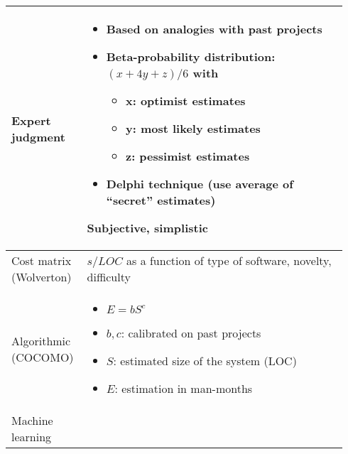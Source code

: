 \begin{table}[!ht]
    \begin{tabular}{p{0.19\linewidth}|p{0.75\linewidth}}
        \toprule
        Expert judgment & \begin{minipage}{\linewidth}\begin{itemize}
                            \item Based on analogies with past projects
                            \item Beta-probability distribution: $(x+4y+z)/6$ with
                                \begin{itemize}
                                    \item x: optimist estimates
                                    \item y: most likely estimates
                                    \item z: pessimist estimates
                                \end{itemize}
                            \item Delphi technique (use average of \enquote{secret}
                            estimates)
                          \end{itemize}
                          Subjective, simplistic\end{minipage} \\
        \midrule
        Cost matrix (Wolverton) &   $s/LOC$ as a function of type of software,
                                    novelty, difficulty \\
        \midrule
        Algorithmic (COCOMO) & \begin{minipage}{\linewidth}\begin{itemize}
                                    \item $E = b {S}^{c}$
                                    \item $b,c$: calibrated on past projects
                                    \item $S$: estimated size of the system (LOC)
                                    \item $E$: estimation in man-months
                               \end{itemize}\end{minipage} \\
        \midrule
        Machine learning &  \begin{minipage}{\linewidth}\begin{itemize}

\end{itemize}
\end{minipage}
\end{tabular}
\end{table}
